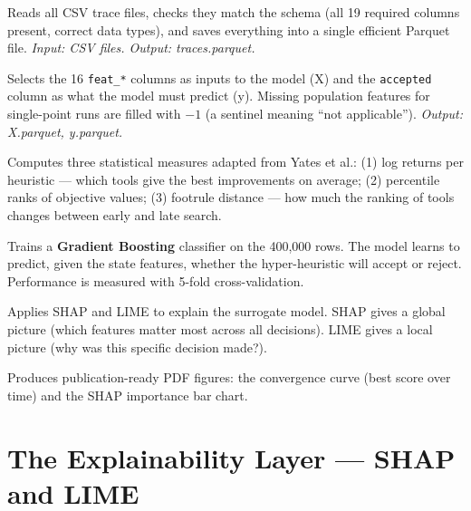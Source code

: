 \documentclass[12pt, a4paper]{article}
\begin{document}
\begin{description}[leftmargin=0cm, style=nextline]

\item[\textbf{Stage 1 --- Load}]
  Reads all CSV trace files, checks they match the schema (all 19 required columns
  present, correct data types), and saves everything into a single efficient Parquet
  file. \textit{Input: CSV files. Output: traces.parquet.}

\item[\textbf{Stage 2 --- Features}]
  Selects the 16 \texttt{feat\_*} columns as inputs to the model (X) and the
  \texttt{accepted} column as what the model must predict (y). Missing population
  features for single-point runs are filled with $-1$ (a sentinel meaning
  ``not applicable''). \textit{Output: X.parquet, y.parquet.}

\item[\textbf{Stage 3 --- Yates Measures}]
  Computes three statistical measures adapted from Yates et al.: (1) log returns
  per heuristic --- which tools give the best improvements on average; (2) percentile
  ranks of objective values; (3) footrule distance --- how much the ranking of tools
  changes between early and late search.

\item[\textbf{Stage 4 --- Train}]
  Trains a \textbf{Gradient Boosting} classifier on the 400,000 rows. The model
  learns to predict, given the state features, whether the hyper-heuristic will
  accept or reject. Performance is measured with 5-fold cross-validation.

\item[\textbf{Stage 5 --- Explain}]
  Applies SHAP and LIME to explain the surrogate model. SHAP gives a global
  picture (which features matter most across all decisions). LIME gives a local
  picture (why was this specific decision made?).

\item[\textbf{Stage 6 --- Figures}]
  Produces publication-ready PDF figures: the convergence curve (best score over
  time) and the SHAP importance bar chart.

\end{description}

\section{The Explainability Layer --- SHAP and LIME}
\end{document}
